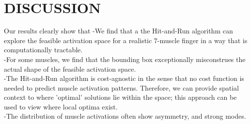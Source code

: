 \section{DISCUSSION}

Our results clearly show that
-We find that a the Hit-and-Run algorithm can explore the feasible activation space for a realistic 7-muscle finger in a way that is computationally tractable.\\
-For some muscles, we find that the bounding box exceptionally misconstrues the actual shape of the feasible activation space.\\
-The Hit-and-Run algorithm is cost-agnostic in the sense that no cost function is needed to predict muscle activation patterns. Therefore, we can provide spatial context to where 'optimal' solutions lie within the space; this approach can be used to view where local optima exist.\\
-The distribution of muscle activations often show asymmetry, and strong modes.


